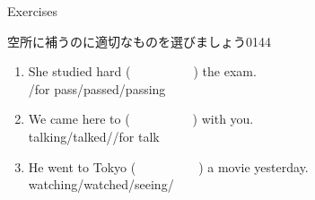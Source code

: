 \documentclass[aspectratio=169,xcolor={dvipsnames,table}]{beamer}
\begin{document}
\begin{frame}[plain]{Exercises}
 
空所に補うのに適切なものを選びましょう\hfill{\tiny 0144}\,{\scriptsize {}}


\begin{enumerate}
 \item She studied hard (~~~~~~~~~~) the exam.\\
\hspace{80pt}\hspace{10pt}/\hspace{10pt}for pass\hspace{10pt}/\hspace{10pt}passed\hspace{10pt}/\hspace{10pt}passing
 \item We came here to (~~~~~~~~~~) with you.\\
\hspace{80pt}talking\hspace{10pt}/\hspace{10pt}talked\hspace{10pt}/\hspace{10pt}\hspace{10pt}/\hspace{10pt}for talk
 \item He went to Tokyo (~~~~~~~~~~) a movie yesterday.\\
\hspace{80pt}watching\hspace{10pt}/\hspace{10pt}watched\hspace{10pt}/\hspace{10pt}seeing\hspace{10pt}/\hspace{10pt}
\end{enumerate}


\end{frame}
\end{document}
